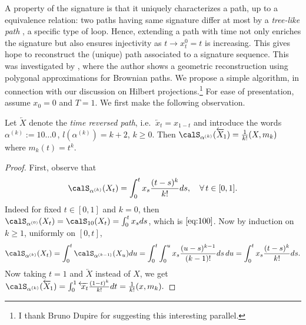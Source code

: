 A property of the signature is that it uniquely characterizes a path, up to a  equivalence relation: two paths having same signature differ at most by a \textit{tree-like path} \cite{Hambly}, a specific type of loop.  
Hence, extending a path with time 
not only enriches the  signature  but also
ensures  injectivity  as $t\to x^0_t =t$ is increasing. 
This gives hope to reconstruct the (unique) path associated to a  signature sequence. This was investigated 
 by \citet{Geng}, where the author shows a 
geometric reconstruction using polygonal approximations for Brownian paths. 
We propose a simple algorithm, in connection with our discussion on Hilbert projections.\footnote{I thank Bruno Dupire for suggesting this interesting parallel.} 
For ease of presentation, assume $x_0=0$ and $T=1$. We first make the following observation. 

\begin{lemma}\label{lem:Legendre}
Let $\overleftarrow{X}$ denote the \textit{time reversed path}, i.e. $\overleftarrow{\ x_t} = x_{1-t}$ and 
introduce the words $\alpha^{(k)} :=10\ldots0\,$, $l(\alpha^{(k)})=k+2$, $k \ge 0$. 
Then $\calS_{\alpha^{(k)}} (\overleftarrow{X}_{\! 1})  = \frac{1}{k!}(X, m_k) $ where $m_k(t)=t^k$.
\end{lemma}
\begin{proof} First, observe that 
\begin{equation}\label{eq:100}
    \calS_{\alpha^{(k)}}(X_{t}) = \int_0^{t} x_s \frac{(t -s)^{k}}{k!}ds,\quad \forall \, t \in [0,1]. 
\end{equation}
Indeed for fixed $t\in [0,1]$ and  $k=0$, then $\calS_{\alpha^{(0)}}(X_t)=\calS_{10}(X_t) = \int_0^t x_sds$, which is $\eqref{eq:100}$. Now by induction on $k\ge 1$, uniformly on $[0,t]$,
\begin{align*}
  \calS_{\alpha^{(k)}}(X_t) = \int_0^t \calS_{\alpha^{(k-1)}}(X_u)du 
    = \int_0^t \int_0^u x_s \frac{(u -s)^{k-1}}{(k-1)!}ds\, du 
    = \int_0^t x_s \frac{(t -s)^{k}}{k!} ds.
\end{align*}
Now taking $t=1$ and $\overleftarrow{X}$ instead of $X$, we get
$
    \calS_{\alpha^{(k)}}(\overleftarrow{X}_{\! 1}) = \int_0^1 \overleftarrow{\ x_t}\frac{(1 -t)^{k}}{k!}dt =  \frac{1}{k!}(x,m_k).
$
\end{proof}

